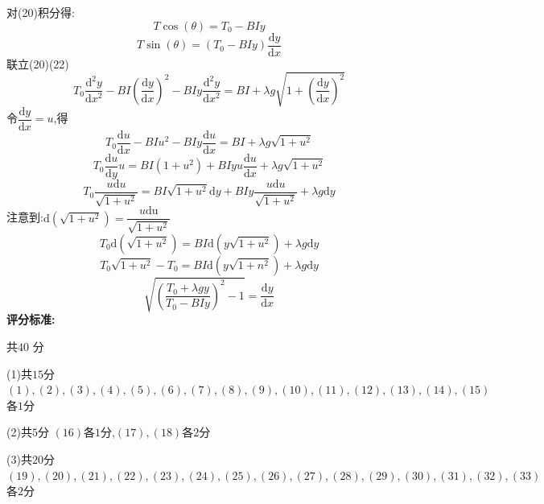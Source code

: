 \documentclass{article}
\begin{document}
对(20)积分得:
\[
T\cos(\theta)=T_0-BIy
\tag{21}
\]
\[
T\sin(\theta)=(T_0-BIy)\dfrac{\mathrm{d}y}{\mathrm{d}x} 
\tag{22}
\]
联立(20)(22)
\[
T_{0}\dfrac{\mathrm{d}^{2}y}{\mathrm{d}x^{2}}-BI\left( \dfrac{\mathrm{d}y}{\mathrm{d}x}\right) ^{2}-BIy\dfrac{\mathrm{d}^{2}y}{\mathrm{d}x^{2}}=BI+\lambda g\sqrt{1+\left(\dfrac{\mathrm{d}y}{\mathrm{d}x}\right)^2}
\tag{23}
\]
令$\dfrac{\mathrm{d}y}{\mathrm{d}x}=u$,得
\[
T_{0}\dfrac{\mathrm{d}u}{\mathrm{d}x}-BIu^{2}-BIy\dfrac{\mathrm{d}u}{\mathrm{d}x}=BI+\lambda g\sqrt{1+u^{2}}
\tag{24}
\]
\[
T_{0}\dfrac{\mathrm{d}u}{\mathrm{d}y}u=BI\left(1+u^{2}\right)+BIyu\dfrac{\mathrm{d}u}{\mathrm{d}x}+\lambda g\sqrt{1+u^{2}}
\tag{25}
\]
\[
T_{0}\dfrac{u\mathrm{d}u}{\sqrt{1+u^{2}}}=BI\sqrt{1+u^{2}}\mathrm{d}y+BIy\dfrac{u\mathrm{d}u}{\sqrt{1+u^{2}}}+\lambda g\mathrm{d}y
\tag{26}
\]
注意到:$\mathrm{d}\left( \sqrt{1+u^{2}}\right) =\dfrac{u\mathrm{du}}{\sqrt{1+u^{2}}}$
\[
    T_0\mathrm{d}\left( \sqrt{1+u^{2}}\right) =BI\mathrm{d}\left( y\sqrt{1+u^{2}}\right) +\lambda g\mathrm{d}y
\tag{27}
\]
\[
    T_{0}\sqrt{1+u^{2}}-T_{0}=BI\mathrm{d}\left( y\sqrt{1+n^{2}}\right) +\lambda g\mathrm{d}y
    \tag{28}
\]
\[
    \sqrt{\left( \dfrac{T_{0}+\lambda gy}{T_{0}-BIy}\right) ^{2}-1}=\dfrac{\mathrm{d}y}{\mathrm{d}x}
    \tag{29}
\]
\textbf{评分标准:}\par
共$40$ 分\par
(1)共$15$分 $(1),(2),(3),(4),(5),(6),(7),(8),(9),(10),(11),(12),(13),(14),(15)$各$1$分\par
(2)共$5$分 $(16)$各$1$分,$(17),(18)$各$2$分\par
(3)共$20$分 $(19),(20),(21),(22),(23),(24),(25),(26),(27),(28),(29),(30),(31),(32),(33)$各$2$分\par
\end{document}
